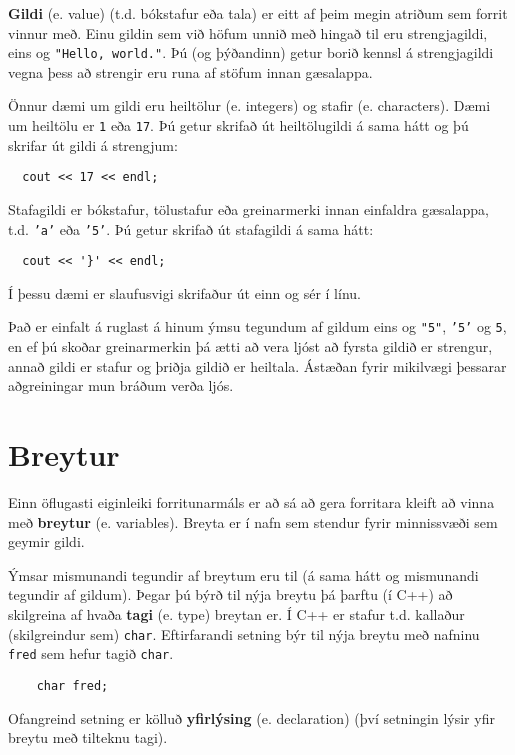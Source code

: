 {\bf Gildi} (e. value) (t.d. bókstafur eða tala) er eitt af þeim megin atriðum sem forrit vinnur með.
Einu gildin sem við höfum unnið með hingað til eru strengjagildi, eins og {\tt "Hello, world."}.
Þú (og þýðandinn) getur borið kennsl á strengjagildi vegna þess að strengir eru runa af stöfum innan gæsalappa.

Önnur dæmi um gildi eru heiltölur (e. integers) og stafir (e. characters).
Dæmi um heiltölu er {\tt 1} eða {\tt 17}. 
Þú getur skrifað út heiltölugildi á sama hátt og þú skrifar út gildi á strengjum:

\begin{verbatim}
  cout << 17 << endl;
\end{verbatim}
%
Stafagildi er bókstafur, tölustafur eða greinarmerki innan einfaldra gæsalappa, t.d. {\tt 'a'} eða {\tt '5'}.
Þú getur skrifað út stafagildi á sama hátt:

\begin{verbatim}
  cout << '}' << endl;
\end{verbatim}
%
Í þessu dæmi er slaufusvigi skrifaður út einn og sér í línu.

Það er einfalt á ruglast á hinum ýmsu tegundum af gildum eins og 
{\tt "5"}, {\tt '5'} og {\tt 5}, en ef þú skoðar greinarmerkin þá ætti að vera ljóst að
fyrsta gildið er strengur, annað gildi er stafur og þriðja gildið er heiltala.
Ástæðan fyrir mikilvægi þessarar aðgreiningar mun bráðum verða ljós.

\section {Breytur}

Einn öflugasti eiginleiki forritunarmáls er að sá að gera forritara kleift að vinna með {\bf breytur} (e. variables).
Breyta er í nafn sem stendur fyrir minnissvæði sem geymir gildi. 

Ýmsar mismunandi tegundir af breytum eru til (á sama hátt og mismunandi tegundir af gildum).
Þegar þú býrð til nýja breytu þá þarftu (í C++) að skilgreina af hvaða {\bf tagi} (e. type) breytan er.
Í C++ er stafur t.d. kallaður (skilgreindur sem) {\tt char}.
Eftirfarandi setning býr til nýja breytu með nafninu {\tt fred} sem hefur tagið {\tt char}.

\begin{verbatim}
    char fred;
\end{verbatim}
%
Ofangreind setning er kölluð {\bf yfirlýsing} (e. declaration) (því setningin lýsir yfir breytu með tilteknu tagi).


